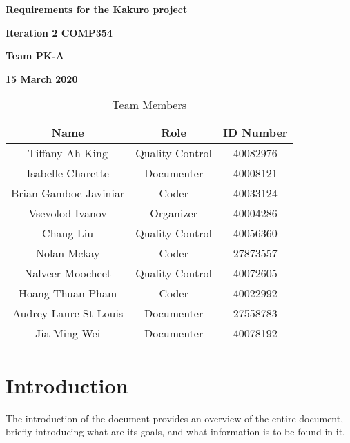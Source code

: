 \documentclass[12pt]{article}
\begin{document}
\vspace*{0.5in}
\centerline{\bf\Large Requirements for the Kakuro project}

\vspace*{0.5in}
\centerline{\bf\Large Iteration 2 COMP354}

\vspace*{0.5in}
\centerline{\bf\Large Team PK-A}

\vspace*{0.5in}
\centerline{\bf\Large 15 March 2020}

\vspace*{1.5in}
\begin{table}[htbp]
\caption{Team Members}
\begin{center}
\begin{tabular}{|c |c | c|}
\hline
Name & Role & ID Number \\
\hline\hline
Tiffany Ah King & Quality Control & 40082976 \\
\hline
Isabelle Charette & Documenter & 40008121 \\
\hline
Brian Gamboc-Javiniar & Coder & 40033124 \\
\hline
Vsevolod Ivanov & Organizer & 40004286 \\
\hline
Chang Liu & Quality Control & 40056360 \\
\hline
Nolan Mckay & Coder & 27873557 \\
\hline
Nalveer Moocheet & Quality Control & 40072605 \\
\hline
Hoang Thuan Pham & Coder & 40022992 \\
\hline
Audrey-Laure St-Louis & Documenter & 27558783 \\
\hline
Jia Ming Wei & Documenter & 40078192 \\
\hline
\end{tabular}
\end{center}
\end{table}


\newpage

\renewcommand*\contentsname{Table of Contents}

\tableofcontents

\clearpage

\section{Introduction}

The introduction of the document provides an overview of the entire document,
briefly introducing what are its goals, and what information is to be found in it.
\end{document}
